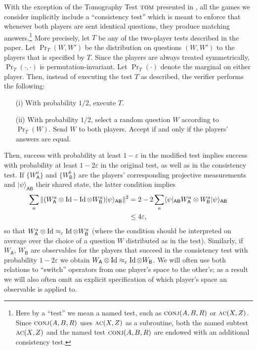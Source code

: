 \documentclass{toc}
\newcommand{\ket}[1]{|#1\rangle}
\newcommand{\bra}[1]{\langle#1|}
\newcommand{\Id}{\ensuremath{\mathop{\rm Id}\nolimits}}
\newcommand{\reg}[1]{{\textsf{#1}}}
\newcommand{\eps}{\varepsilon}
\newcommand{\conj}{\textsc{conj}}
\newcommand{\act}{\textsc{ac}}
\newcommand{\tom}{\textsc{tom}}
\begin{document}
With the exception of the Tomography Test $\tom$ presented in , 
all the games we consider implicitly include a ``consistency test'' which is meant to enforce that whenever both players are sent identical questions, they produce matching answers.\footnote{Here by a ``test'' we mean a named test, such as $\conj(A,B,R)$ or $\act(X,Z)$. Since $\conj(A,B,R)$ uses $\act(X,Z)$ as a subroutine, both the named subtest $\act(X,Z)$ and the named test $\conj(A,B,R)$ are endowed with an additional consistency test.} More precisely, let $T$ be any of the two-player tests described in the paper. Let $\Pr_T(W,W')$ be the distribution on questions $(W,W')$ to the players that is specified by $T$. Since the players are always treated symmetrically, $\Pr_T(\cdot,\cdot)$ is permutation-invariant. Let $\Pr_T(\cdot)$ denote the marginal on either player. Then, instead of executing the test $T$ as described, the verifier performs the following: 
\begin{enumerate}
\item[(i)] With probability $1/2$, execute $T$.
\item[(ii)] With probability $1/2$, select a random question $W$ according to $\Pr_T(W)$. Send $W$ to both players. Accept if and only if the players' answers are equal. 
\end{enumerate}
Then, success with probability at least $1-\eps$ in the modified test implies success with probability at least $1-2\eps$ in the original test, as well as in the consistency test. If $\{W_{\reg{A}}^a\}$ and $\{W_{\reg{B}}^b\}$ are the players' corresponding projective measurements and $\ket{\psi}_{\reg{AB}}$ their shared state, the latter condition implies 
\begin{align}
\sum_a \|(W_{\reg{A}}^a \otimes \Id - \Id \otimes W_{\reg{B}}^a)\ket{\psi}_{\reg{AB}}\|^2 &= 2-2 \sum_a \bra{\psi}_{\reg{AB}} W_{\reg{A}}^a \otimes W_{\reg{B}}^a \ket{\psi}_{\reg{AB}} \notag\\ 
&\leq 4 \eps,\label{eq:consistency}
\end{align}
so that $W_{\reg{A}}^a \otimes \Id \approx_{\eps} \Id \otimes
W_{\reg{B}}^a$ (where the condition should be interpreted on average over the
choice of a question $W$ distributed as in the test). Similarly, if
$W_{\reg{A}}$, $W_{\reg{B}}$ are observables for the players that succeed in the
consistency test with probability $1-2\eps$ we obtain $W_{\reg{A}}\otimes \Id
\approx_{\eps} \Id \otimes W_{\reg{B}}$. We will often use both relations to ``switch'' operators from one player's space to the other's; as a result we will also often omit an explicit specification of which player's space an observable is applied to. 
\end{document}
